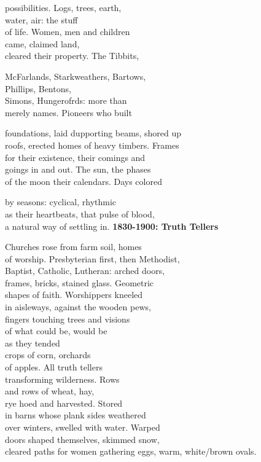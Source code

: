 \documentclass[twoside,10pt]{book}
\begin{document}
possibilities. Logs, trees, earth,\\
water, air: the stuff\\
of life. Women, men and children\\
came, claimed land,\\
cleared their property. The Tibbits,

McFarlands, Starkweathers, Bartows,\\
Phillips, Bentons,\\
Simons, Hungerofrds: more than\\
merely names. Pioneers who built

foundations, laid dupporting beams, shored up\\
roofs, erected homes of heavy timbers. Frames\\
for their existence, their comings and\\
goings in and out. The sun, the phases\\
of the moon their calendars. Days colored

by seasons: cyclical, rhythmic\\
as their heartbeats, that pulse of blood,\\
a natural way of settling in.
\clearpage
{\bf 1830-1900: Truth Tellers}

Churches rose from farm soil, homes\\
of worship. Presbyterian first, then Methodist,\\
Baptist, Catholic, Lutheran: arched doors,\\
frames, bricks, stained glass. Geometric\\
shapes of faith. Worshippers kneeled\\
in aisleways, against the wooden pews,\\
fingers touching trees and visions\\
of what could be, would be\\
as they tended\\
crops of corn, orchards\\
of apples. All truth tellers\\
transforming wilderness. Rows\\
and rows of wheat, hay,\\
rye hoed and harvested. Stored\\
in barns whose plank sides weathered\\
over winters, swelled with water. Warped\\
doors shaped themselves, skimmed snow,\\
cleared paths for women gathering eggs, warm, white/brown ovals.
\end{document}

